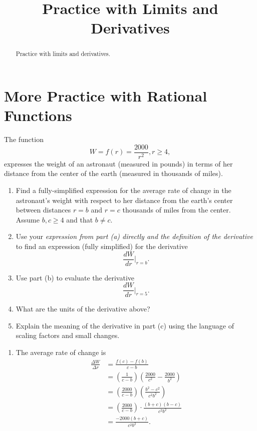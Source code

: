 \documentclass{ximera}
\title{Practice with Limits and Derivatives}
\begin{document}
\begin{abstract}
Practice with limits and derivatives.
\end{abstract}
\maketitle


\section{More Practice with Rational Functions}

\begin{question} \label{QPODFDgdfgfg}
The function
\[
        W = f(r) = \frac{2000}{r^2} , r\geq 4 ,
\]
expresses the weight of an astronaut (measured in pounds) in terms of her distance from the center of the earth (measured in thousands of miles).

\begin{enumerate}
\item  Find a fully-simplified expression for the average rate of change in the astronaut's weight with respect to her distance from the earth's center between distances $r=b$ and $r=c$ thousands of miles from the center. Assume $b,c\geq 4$ and that $b\neq c$.

\item Use your \emph{expression from part (a) directly and the definition of the derivative} to find an expression (fully simplified) for the derivative
\[
   \frac{dW}{dr}\Big|_{r=b} .
\]

\item Use part (b) to evaluate the derivative
\[
   \frac{dW}{dr}\Big|_{r=5} .
\]

\item What are the units of the derivative above?

\item Explain the meaning of the derivative in part (c) using the language of scaling factors and small changes.
\end{enumerate}

\begin{explanation}
\begin{enumerate}
\item The average rate of change is
\begin{align*}
  \frac{\Delta W}{\Delta r} &= \frac{f(c) - f(b)}{c-b}  \\
                                       &= \left(\frac{1}{c-b}\right) \left( \frac{2000}{c^2} - \frac{2000}{b^2} \right) \\
                                       &=\left(\frac{2000}{c-b}\right) \left( \frac{b^2-c^2}{c^2 b^2} \right) \\
                                        &=\left(\frac{2000}{c-b}\right) \cdot \frac{(b+c)(b-c)}{c^2 b^2}  \\
                                        &= \frac{-2000(b+c)}{c^2 b^2} .
\end{align*}


\end{enumerate}
\end{explanation}
\end{question}
\end{document}
